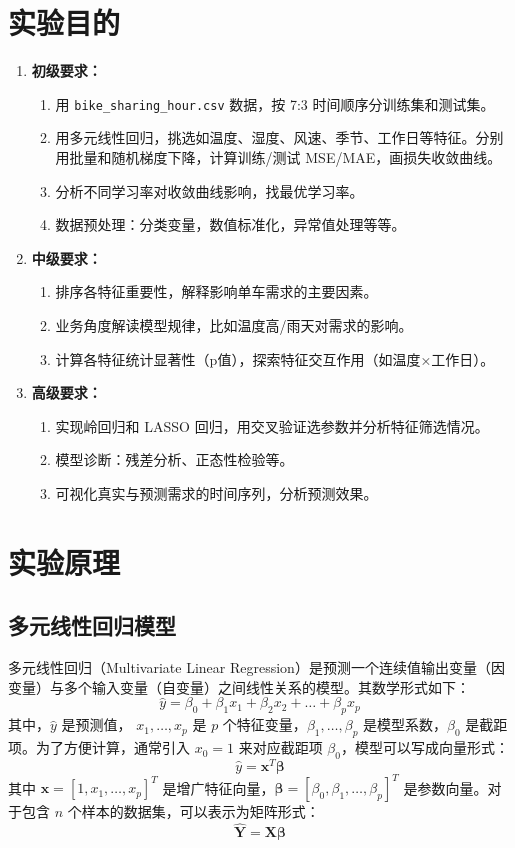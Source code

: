\documentclass[UTF8,a4paper,10pt]{ctexart}
\begin{document}
\section{实验目的}
\begin{enumerate}
    \item \textbf{初级要求：}
    \begin{enumerate}[label=(\roman*)]
        \item 用 \texttt{bike\_sharing\_hour.csv} 数据，按 7:3 时间顺序分训练集和测试集。
  \item 用多元线性回归，挑选如温度、湿度、风速、季节、工作日等特征。分别用批量和随机梯度下降，计算训练/测试 MSE/MAE，画损失收敛曲线。
  \item 分析不同学习率对收敛曲线影响，找最优学习率。
  \item 数据预处理：分类变量，数值标准化，异常值处理等等。
    \end{enumerate}
    
    \item \textbf{中级要求：} 
     \begin{enumerate}[label=(\roman*)]
        \item 排序各特征重要性，解释影响单车需求的主要因素。
  \item 业务角度解读模型规律，比如温度高/雨天对需求的影响。
  \item 计算各特征统计显著性（p值），探索特征交互作用（如温度×工作日）。
    \end{enumerate}

    
    \item \textbf{高级要求：} 
    \begin{enumerate}[label=(\roman*)]
        \item 实现岭回归和 LASSO 回归，用交叉验证选参数并分析特征筛选情况。
  \item 模型诊断：残差分析、正态性检验等。
  \item 可视化真实与预测需求的时间序列，分析预测效果。
    \end{enumerate}

\end{enumerate}


\section{实验原理}
\subsection{多元线性回归模型}
多元线性回归（Multivariate Linear Regression）是预测一个连续值输出变量（因变量）与多个输入变量（自变量）之间线性关系的模型。其数学形式如下：
$$
\hat{y} = \beta_0 + \beta_1 x_1 + \beta_2 x_2 + \dots + \beta_p x_p
$$
其中，$\hat{y}$ 是预测值， $x_1, \dots, x_p$ 是 $p$ 个特征变量，$\beta_1, \dots, \beta_p$ 是模型系数，$\beta_0$ 是截距项。为了方便计算，通常引入 $x_0=1$ 来对应截距项 $\beta_0$，模型可以写成向量形式：
$$
\hat{y} = \mathbf{x}^T \boldsymbol{\beta}
$$
其中 $\mathbf{x} = [1, x_1, \dots, x_p]^T$ 是增广特征向量，$\boldsymbol{\beta} = [\beta_0, \beta_1, \dots, \beta_p]^T$ 是参数向量。对于包含 $n$ 个样本的数据集，可以表示为矩阵形式：
$$
\hat{\mathbf{Y}} = \mathbf{X}\boldsymbol{\beta}
$$
\end{document}
